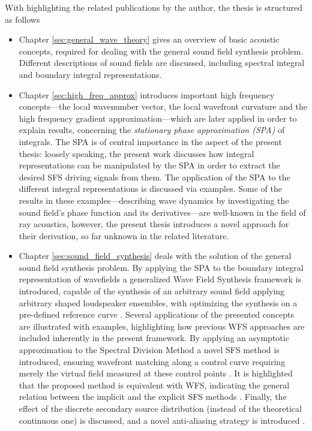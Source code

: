 With highlighting the related publications by the author, the thesis is structured as follows
\begin{itemize}
\item Chapter \ref{sec:general_wave_theory} gives an overview of basic acoustic concepts, required for dealing with the general sound field synthesis problem.
Different descriptions of sound fields are discussed, including spectral integral and boundary integral representations.
%
\item Chapter \ref{sec:high_freq_approx} introduces important high frequency concepts---the local wavenumber vector, the local wavefront curvature and the high frequency gradient approximation---which are later applied in order to explain results, concerning the \emph{stationary phase approximation (SPA)} of integrals.
The SPA is of central importance in the aspect of the present thesis: loosely speaking, the present work discusses how integral representations can be manipulated by the SPA in order to extract the desired SFS driving signals from them.
The application of the SPA to the different integral representations is discussed via examples.
Some of the results in these examples---describing wave dynamics by investigating the sound field's phase function and its derivatives---are well-known in the field of ray acoustics, however, the present thesis introduces a novel approach for their derivation, so far unknown in the related literature.
%
\item Chapter \ref{sec:sound_field_synthesis} deals with the solution of the general sound field synthesis problem.
By applying the SPA to the boundary integral representation of wavefields a generalized Wave Field Synthesis framework is introduced, capable of the synthesis of an arbitrary sound field applying arbitrary shaped loudspeaker ensembles, with optimizing the synthesis on a pre-defined reference curve \cite{Firtha2016, schultz2017wave}.
Several applications of the presented concepts are illustrated with examples, highlighting how previous WFS approaches are included inherently in the present framework.
By applying an asymptotic approximation to the Spectral Division Method a novel SFS method is introduced, ensuring wavefront matching along a control curve requiring merely the virtual field measured at these control points \cite{Firtha2017:daga}.
It is highlighted that the proposed method is equivalent with WFS, indicating the general relation between the implicit and the explicit SFS methods \cite{Firtha2018:WFS_vs_SDM, Schultz2019:HOA_vs_WFS}.
Finally, the effect of the discrete secondary source distribution (instead of the theoretical continuous one) is discussed, and a novel anti-aliasing strategy is introduced \cite{Firtha2018_daga_a, 8611109}.

\end{itemize}
